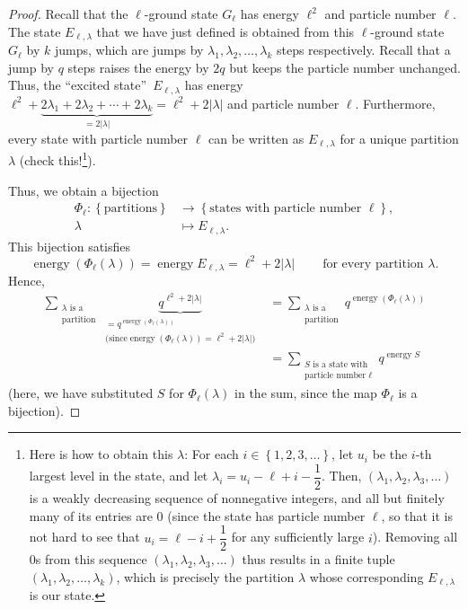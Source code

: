 \begin{proof}
Recall that the $\ell$-ground state $G_{\ell}$ has energy $\ell^{2}$ and
particle number $\ell$. The state $E_{\ell,\lambda}$ that we have just defined
is obtained from this $\ell$-ground state $G_{\ell}$ by $k$ jumps, which are
jumps by $\lambda_{1},\lambda_{2},\ldots,\lambda_{k}$ steps respectively.
Recall that a jump by $q$ steps raises the energy by $2q$ but keeps the
particle number unchanged. Thus, the \textquotedblleft excited
state\textquotedblright\ $E_{\ell,\lambda}$ has energy $\ell^{2}%
+\underbrace{2\lambda_{1}+2\lambda_{2}+\cdots+2\lambda_{k}}_{=2\left\vert
\lambda\right\vert }=\ell^{2}+2\left\vert \lambda\right\vert $ and particle
number $\ell$. Furthermore, every state with particle number $\ell$ can be
written as $E_{\ell,\lambda}$ for a unique partition $\lambda$ (check
this!\footnote{Here is how to obtain this $\lambda$: For each $i\in\left\{
1,2,3,\ldots\right\}  $, let $u_{i}$ be the $i$-th largest level in the state,
and let $\lambda_{i}=u_{i}-\ell+i-\dfrac{1}{2}$. Then, $\left(  \lambda
_{1},\lambda_{2},\lambda_{3},\ldots\right)  $ is a weakly decreasing sequence
of nonnegative integers, and all but finitely many of its entries are $0$
(since the state has particle number $\ell$, so that it is not hard to see
that $u_{i}=\ell-i+\dfrac{1}{2}$ for any sufficiently large $i$). Removing all
$0$s from this sequence $\left(  \lambda_{1},\lambda_{2},\lambda_{3}%
,\ldots\right)  $ thus results in a finite tuple $\left(  \lambda_{1}%
,\lambda_{2},\ldots,\lambda_{k}\right)  $, which is precisely the partition
$\lambda$ whose corresponding $E_{\ell,\lambda}$ is our state.}).

Thus, we obtain a bijection%
\begin{align*}
\Phi_{\ell}:\left\{  \text{partitions}\right\}   &  \rightarrow\left\{
\text{states with particle number }\ell\right\}  ,\\
\lambda &  \mapsto E_{\ell,\lambda}.
\end{align*}
This bijection satisfies%
\[
\operatorname*{energy}\left(  \Phi_{\ell}\left(  \lambda\right)  \right)
=\operatorname*{energy}E_{\ell,\lambda}=\ell^{2}+2\left\vert \lambda
\right\vert \ \ \ \ \ \ \ \ \ \ \text{for every partition }\lambda.
\]
Hence,%
\begin{align}
\sum_{\substack{\lambda\text{ is a}\\\text{partition}}}\underbrace{q^{\ell
^{2}+2\left\vert \lambda\right\vert }}_{\substack{=q^{\operatorname*{energy}%
\left(  \Phi_{\ell}\left(  \lambda\right)  \right)  }\\\text{(since
}\operatorname*{energy}\left(  \Phi_{\ell}\left(  \lambda\right)  \right)
=\ell^{2}+2\left\vert \lambda\right\vert \text{)}}}  &  =\sum
_{\substack{\lambda\text{ is a}\\\text{partition}}}q^{\operatorname*{energy}%
\left(  \Phi_{\ell}\left(  \lambda\right)  \right)  }\nonumber\\
&  =\sum_{\substack{S\text{ is a state with}\\\text{particle number }\ell
}}q^{\operatorname*{energy}S} \label{pf.thm.pars.jtp2.rhs5}%
\end{align}
(here, we have substituted $S$ for $\Phi_{\ell}\left(  \lambda\right)  $ in
the sum, since the map $\Phi_{\ell}$ is a bijection).


\end{proof}
